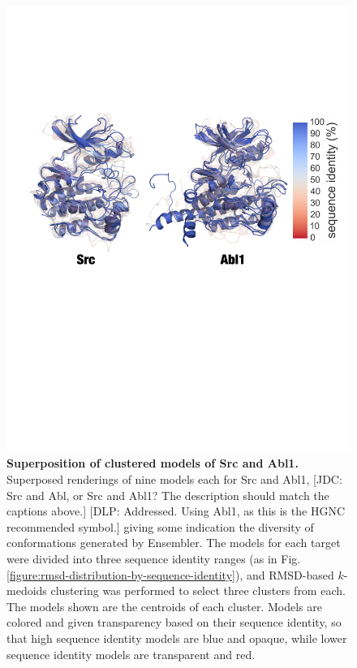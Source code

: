 \documentclass[aps,pre,twocolumn,nofootinbib,superscriptaddress,linenumbers]{revtex4-1}
\begin{document}
\begin{figure}[tb]
    \includegraphics[width=1.0\columnwidth]{superposition-src_abl/superposed-seqid_classes-clustered-one_fig}
    
    \caption{{\bf Superposition of clustered models of Src and Abl1.}
    Superposed renderings of nine models each for Src and Abl1, 
    {\color{red}[JDC: Src and Abl, or Src and Abl1? The description should match the captions above.]}
    {\color{blue}[DLP: Addressed. Using Abl1, as this is the HGNC recommended symbol.]}
    giving some indication the diversity of conformations generated by Ensembler.
    The models for each target were divided into three sequence identity ranges (as in Fig. \ref{figure:rmsd-distribution-by-sequence-identity}), and RMSD-based $k$-medoids clustering was performed to select three clusters from each.
    The models shown are the centroids of each cluster.
    Models are colored and given transparency based on their sequence identity, so that high sequence identity models are blue and opaque, while lower sequence identity models are transparent and red.
  }
  \label{figure:superposition}
\end{figure}
\end{document}
